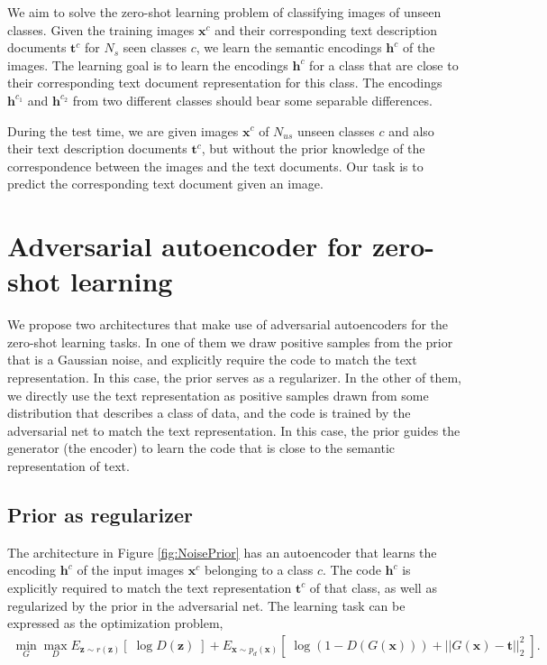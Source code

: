 \documentclass{article}
\newcommand{\bb}[1]{\boldsymbol{#1}}
\begin{document}
	We aim to solve the zero-shot learning problem of classifying images of unseen classes. Given the training images $\bb{x}^c$ and their corresponding text description documents $\bb{t}^c$ for $N_s$ seen classes $c$, we learn the semantic encodings $\bb{h}^c$ of the images. The learning goal is to learn the encodings $\bb{h}^c$ for a class that are close to their corresponding text document representation for this class. The encodings $\bb{h}^{c_1}$ and $\bb{h}^{c_2}$ from two different classes should bear some separable differences.
	
	During the test time, we are given images $\bb{x}^c$ of $N_{us}$ unseen classes $c$ and also their text description documents $\bb{t}^c$, but without the prior knowledge of the correspondence between the images and the text documents. Our task is to predict the corresponding text document given an image.




\section{Adversarial autoencoder for zero-shot learning}

	We propose two architectures that make use of adversarial autoencoders for the zero-shot learning tasks. In one of them we draw positive samples from the prior that is a Gaussian noise, and explicitly require the code to match the text representation. In this case, the prior serves as a regularizer. In the other of them, we directly use the text representation as positive samples drawn from some distribution that describes a class of data, and the code is trained by the adversarial net to match the text representation. In this case, the prior guides the generator (the encoder) to learn the code that is close to the semantic representation of text.




\subsection{Prior as regularizer}
	
	The architecture in Figure \ref{fig:NoisePrior} has an autoencoder that learns the encoding $\bb{h}^c$ of the input images $\bb{x}^c$ belonging to a class $c$. The code $\bb{h}^c$ is explicitly required to match the text representation $\bb{t}^c$ of that class, as well as regularized by the prior in the adversarial net. The learning task can be expressed as the optimization problem,
	\begin{align}
		\min_{G} \max_D E_{\bb{z} \sim r(\bb{z})}\left[\; \log D(\bb{z}) \;\right] + E_{\bb{x} \sim p_d(\bb{x})}\left[\; \log( 1 - D(G(\bb{x})) ) + || G(\bb{x}) - \bb{t} ||_2^2 \;\right].
	\end{align}
	
\end{document}
